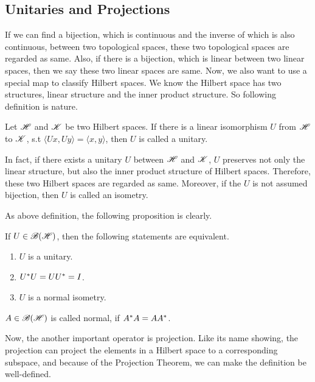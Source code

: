 \documentclass[a4paper,11pt]{report}
\begin{document}
\subsection{Unitaries and Projections}

If we can find a bijection, which is continuous and the inverse of which is also continuous, between two topological spaces, these two topological spaces are regarded as same. Also, if there is a bijection, which is linear between two linear spaces, then we say these two linear spaces are same. Now, we also want to use a special map to classify Hilbert spaces. We know the Hilbert space has two structures, linear structure and the inner product structure. So following definition is nature.

\begin{defn}
	Let $\mathscr{H}$ and $\mathscr{K}$ be two Hilbert spaces. If there is a linear isomorphism $U$ from $\mathscr{H}$ to $\mathscr{K}$, s.t $\langle Ux,Uy \rangle = \langle x,y \rangle$, then $U$ is called a unitary.
\end{defn}
\begin{rem}
	In fact, if there exists a unitary $U$ between $\mathscr{H}$ and $\mathscr{K}$, $U$ preserves not only the linear structure, but also the inner product structure of Hilbert spaces. Therefore, these two Hilbert spaces are regarded as same. Moreover, if the $U$ is not assumed bijection, then $U$ is called an isometry.
\end{rem}

As above definition, the following proposition is clearly.

\begin{prop}
	If $U \in \mathscr{B(H)}$, then the following statements are equivalent.
	\begin{enumerate}[label=\arabic*)]
		\item $U$ is a unitary.
		\item $U^{*}U = UU^{*} = I$.
		\item $U$ is a normal isometry.
	\end{enumerate}
\end{prop}
\begin{rem}
	$A \in \mathscr{B(H)}$ is called normal, if $A^{*}A=AA^{*}$.
\end{rem}

Now, the another important operator is projection. Like its name showing, the projection can project the elements in a Hilbert space to a corresponding subspace, and because of the Projection Theorem, we can make the definition be well-defined.
\end{document}
